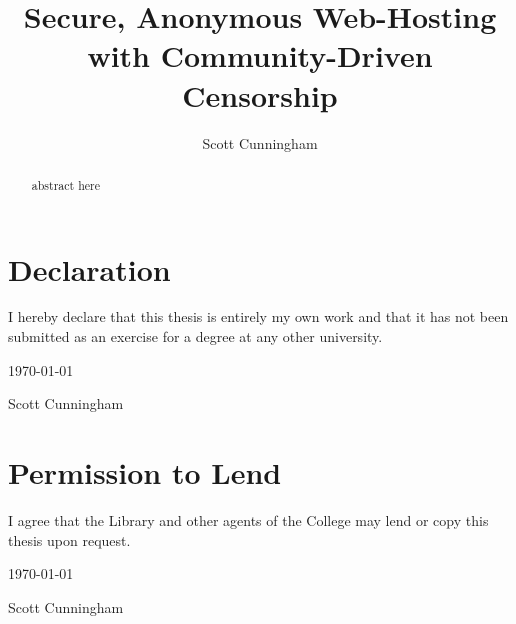 
\title{Secure, Anonymous Web-Hosting with Community-Driven Censorship}
\author{Scott Cunningham}

\maketitle

\chapter*{Declaration}

I hereby declare that this thesis is entirely my own work and that it
has not been submitted as an exercise for a degree at any other
university.

\begin{center}
    \vspace*{2in}

    \underline{\hspace*{3in}} \today

    Scott Cunningham

\end{center}

\chapter*{Permission to Lend}

I agree that the Library and other agents of
the College may lend or copy this thesis upon request.

\begin{center}
    \vspace*{2in}

    \underline{\hspace*{3in}} \today

    Scott Cunningham


\end{center}


\begin{abstract}

abstract here

\end{abstract}

